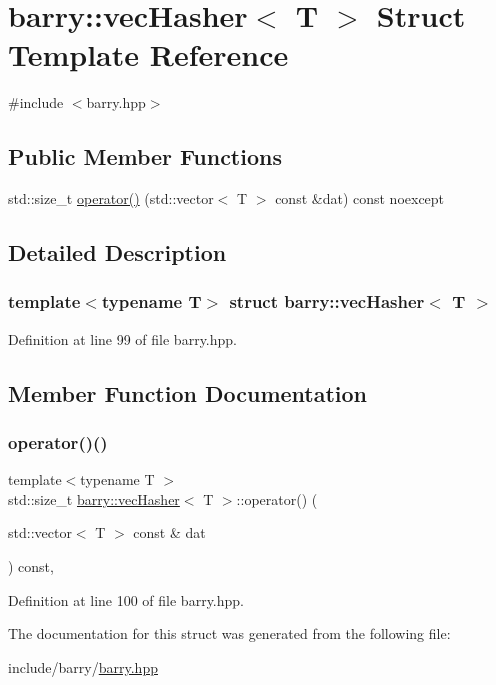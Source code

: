 \hypertarget{structbarry_1_1vec_hasher}{}\section{barry\+:\+:vec\+Hasher$<$ T $>$ Struct Template Reference}
\label{structbarry_1_1vec_hasher}


{\ttfamily \#include $<$barry.\+hpp$>$}

\subsection*{Public Member Functions}
\begin{DoxyCompactItemize}
\item 
std\+::size\+\_\+t \hyperlink{structbarry_1_1vec_hasher_ada8dea483f4fc12f469e161b2fd09225}{operator()} (std\+::vector$<$ T $>$ const \&dat) const noexcept
\end{DoxyCompactItemize}


\subsection{Detailed Description}
\subsubsection*{template$<$typename T$>$\newline
struct barry\+::vec\+Hasher$<$ T $>$}



Definition at line 99 of file barry.\+hpp.



\subsection{Member Function Documentation}
\mbox{\label{structbarry_1_1vec_hasher_ada8dea483f4fc12f469e161b2fd09225}} 
\subsubsection{\texorpdfstring{operator()()}{operator()()}}
{\footnotesize\ttfamily template$<$typename T $>$ \\
std\+::size\+\_\+t \hyperlink{structbarry_1_1vec_hasher}{barry\+::vec\+Hasher}$<$ T $>$\+::operator() (\begin{DoxyParamCaption}\item[{std\+::vector$<$ T $>$ const \&}]{dat }\end{DoxyParamCaption}) const\hspace{0.3cm}{\ttfamily [inline]}, {\ttfamily [noexcept]}}



Definition at line 100 of file barry.\+hpp.



The documentation for this struct was generated from the following file\+:\begin{DoxyCompactItemize}
\item 
include/barry/\hyperlink{barry_8hpp}{barry.\+hpp}\end{DoxyCompactItemize}

